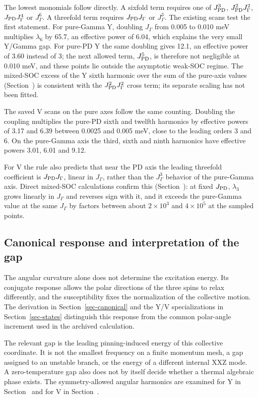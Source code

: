 The lowest monomials follow directly. A sixfold term requires one of
\(J_{\rm PD}^3\), \(J_{\rm PD}^2J_\Gamma^2\), \(J_{\rm PD}J_\Gamma^4\) or
\(J_\Gamma^6\). A threefold term requires \(J_{\rm PD}J_\Gamma\) or
\(J_\Gamma^3\). The existing scans test the first statement. For
pure-Gamma Y, doubling \(J_\Gamma\) from 0.005 to 0.010 meV multiplies
\(\lambda_6\) by 65.7, an effective power of 6.04, which explains the
very small Y/Gamma gap. For pure-PD Y the same doubling gives 12.1, an
effective power of 3.60 instead of 3; the next allowed term,
\(J_{\rm PD}^5\), is therefore not negligible at 0.010 meV, and these
points lie outside the asymptotic weak-SOC regime. The mixed-SOC excess
of the Y sixth harmonic over the sum of the pure-axis values
(Section~) is consistent with the
\(J_{\rm PD}^2J_\Gamma^2\) cross term; its separate scaling has not been
fitted.

The saved V scans on the pure axes follow the same counting. Doubling
the coupling multiplies the pure-PD sixth and twelfth harmonics by
effective powers of 3.17 and 6.39 between 0.0025 and 0.005 meV, close to
the leading orders 3 and 6. On the pure-Gamma axis the third, sixth and
ninth harmonics have effective powers 3.01, 6.01 and 9.12.

For V the rule also predicts that near the PD axis the leading threefold
coefficient is \(J_{\rm PD}J_\Gamma\), linear in \(J_\Gamma\), rather than
the \(J_\Gamma^3\) behavior of the pure-Gamma axis. Direct mixed-SOC
calculations confirm this (Section~): at fixed
\(J_{\rm PD}\), \(\lambda_3\) grows linearly in \(J_\Gamma\) and reverses
sign with it, and it exceeds the pure-Gamma value at the same
\(J_\Gamma\) by factors between about \(2\times10^3\) and \(4\times10^5\)
at the sampled points.

\subsection{Canonical response and interpretation of the
gap}\label{canonical-response-and-interpretation-of-the-gap}

The angular curvature alone does not determine the excitation energy.
Its conjugate response allows the polar directions of the three spins to
relax differently, and the susceptibility fixes the normalization of the
collective motion. The derivation in Section~\ref{sec-canonical} and the
Y/V specializations in Section~\ref{sec-states} distinguish this
response from the common polar-angle increment used in the archived
calculation.

The relevant gap is the leading pinning-induced energy of this
collective coordinate. It is not the smallest frequency on a finite
momentum mesh, a gap assigned to an unstable branch, or the energy of a
different internal XXZ mode. A zero-temperature gap also does not by
itself decide whether a thermal algebraic phase exists. The
symmetry-allowed angular harmonics are examined for Y in
Section~ and for V in
Section~.
